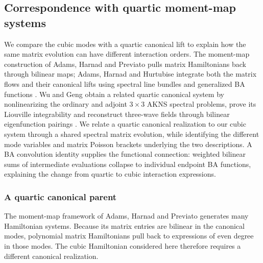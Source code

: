 \subsection{Correspondence with quartic moment-map systems}
\label{sec:AHH-comparison}

We compare the cubic modes with a quartic canonical lift to explain
how the same matrix evolution can have different interaction orders.
The moment-map construction of Adams, Harnad and Previato pulls
matrix Hamiltonians back through bilinear maps; Adams, Harnad and
Hurtubise integrate
both the matrix flows and their canonical lifts using spectral line
bundles and generalized BA functions
\cite{AdamsHarnadPreviato1988,AdamsHarnadHurtubise1990II}.
Wu and Geng obtain a related quartic canonical system by nonlinearizing
the ordinary and adjoint $3\times3$ AKNS spectral problems, prove its
Liouville integrability and reconstruct three-wave fields through
bilinear eigenfunction pairings \cite[Sections~III--V]{WuGeng1999}.
We relate a quartic canonical realization to our cubic system through
a shared spectral matrix evolution, while identifying the different
mode variables and matrix Poisson brackets underlying the two
descriptions. A BA convolution identity supplies the functional
connection: weighted bilinear sums of intermediate evaluations
collapse to individual endpoint BA functions, explaining the change
from quartic to cubic interaction expressions.

\subsubsection{A quartic canonical parent}

The moment-map framework of Adams, Harnad and Previato
\cite{AdamsHarnadPreviato1988} generates many Hamiltonian systems. Because
its matrix entries are bilinear in the canonical modes, polynomial
matrix Hamiltonians pull back to expressions of even degree in those
modes. The cubic Hamiltonian considered here therefore requires a
different canonical realization.

